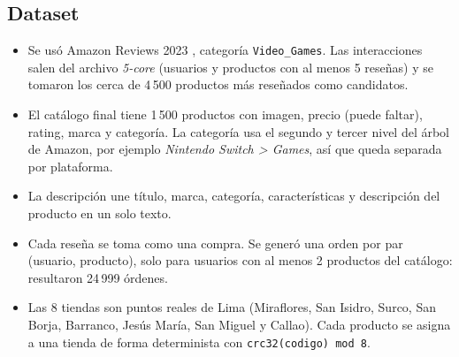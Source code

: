 \subsection{Dataset}
\begin{itemize}
  \item Se usó Amazon Reviews 2023 \citep{amazon2023}, categoría \texttt{Video\_Games}. Las interacciones salen del archivo \emph{5-core} (usuarios y productos con al menos 5 reseñas) y se tomaron los cerca de 4\,500 productos más reseñados como candidatos.
  \item El catálogo final tiene 1\,500 productos con imagen, precio (puede faltar), rating, marca y categoría. La categoría usa el segundo y tercer nivel del árbol de Amazon, por ejemplo \emph{Nintendo Switch > Games}, así que queda separada por plataforma.
  \item La descripción une título, marca, categoría, características y descripción del producto en un solo texto.
  \item Cada reseña se toma como una compra. Se generó una orden por par (usuario, producto), solo para usuarios con al menos 2 productos del catálogo: resultaron 24\,999 órdenes.
  \item Las 8 tiendas son puntos reales de Lima (Miraflores, San Isidro, Surco, San Borja, Barranco, Jesús María, San Miguel y Callao). Cada producto se asigna a una tienda de forma determinista con \texttt{crc32(codigo) mod 8}.
\end{itemize}

